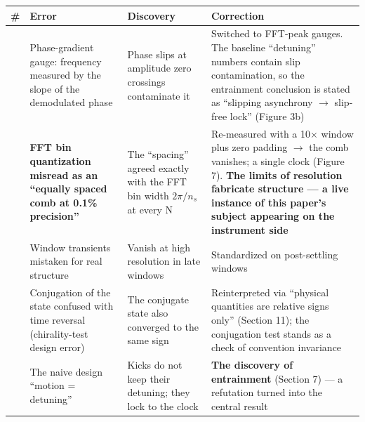 \documentclass[
  a4paper,
]{article}
\newcounter{none} %
\begin{document}
{\def\LTcaptype{none} %
\begin{longtable}[]{@{}
  >{\raggedright\arraybackslash}p{}
  >{\raggedright\arraybackslash}p{}
  >{\raggedright\arraybackslash}p{}
  >{\raggedright\arraybackslash}p{}@{}}
\toprule\noalign{}
\begin{minipage}[b]{\linewidth}\raggedright
\#
\end{minipage} & \begin{minipage}[b]{\linewidth}\raggedright
Error
\end{minipage} & \begin{minipage}[b]{\linewidth}\raggedright
Discovery
\end{minipage} & \begin{minipage}[b]{\linewidth}\raggedright
Correction
\end{minipage} \\
\midrule\noalign{}
\endhead
\bottomrule\noalign{}
\endlastfoot
1 & Phase-gradient gauge: frequency measured by the slope of the
demodulated phase & Phase slips at amplitude zero crossings contaminate
it & Switched to FFT-peak gauges. The baseline ``detuning'' numbers
contain slip contamination, so the entrainment conclusion is stated as
``slipping asynchrony \(\to\) slip-free lock'' (Figure 3b) \\
2 & \textbf{FFT bin quantization misread as an ``equally spaced comb at
0.1\% precision''} & The ``spacing'' agreed exactly with the FFT bin
width \(2\pi/n_s\) at every N & Re-measured with a 10\(\times\) window
plus zero padding \(\to\) the comb vanishes; a single clock (Figure 7).
\textbf{The limits of resolution fabricate structure --- a live instance
of this paper's subject appearing on the instrument side} \\
3 & Window transients mistaken for real structure & Vanish at high
resolution in late windows & Standardized on post-settling windows \\
4 & Conjugation of the state confused with time reversal (chirality-test
design error) & The conjugate state also converged to the same sign &
Reinterpreted via ``physical quantities are relative signs only''
(Section 11); the conjugation test stands as a check of convention
invariance \\
5 & The naive design ``motion = detuning'' & Kicks do not keep their
detuning; they lock to the clock & \textbf{The discovery of entrainment}
(Section 7) --- a refutation turned into the central result \\
\end{longtable}
}
\end{document}
